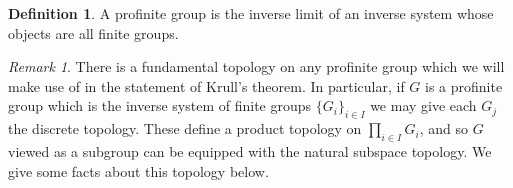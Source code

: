 \documentclass{article}
\theoremstyle{definition}
\newtheorem{definition}[theorem]{Definition}
\theoremstyle{remark}
\newtheorem*{remark}{Remark}
\theoremstyle{plain}
\begin{document}
\begin{definition}
	A profinite group is the inverse limit of an inverse system whose objects are all finite groups.
\end{definition}

\begin{remark}
	There is a fundamental topology on any profinite group which we will make use of in the statement of Krull's theorem.
	In particular, if $G$ is a profinite group which is the inverse system of finite groups $\{G_i\}_{i \in I}$ we may give each $G_j$ the discrete topology.
	These define a product topology on $\prod_{i \in I} G_i$, and so $G$ viewed as a subgroup can be equipped with the natural subspace topology.
	We give some facts about this topology below.
\end{remark}
	
\end{document}
